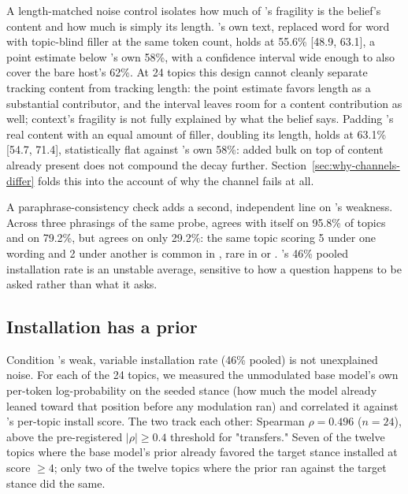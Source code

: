 A length-matched noise control isolates how much of \condB{}'s fragility is the
belief's content and how much is simply its length. \condB{}'s own text, replaced word
for word with topic-blind filler at the same token count, holds at 55.6\% [48.9, 63.1],
a point estimate below \condB{}'s own 58\%, with a confidence interval wide enough to
also cover the bare host's 62\%. At 24 topics this design cannot cleanly separate
tracking content from tracking length: the point estimate favors length as a substantial
contributor, and the interval leaves room for a content contribution as well; context's
fragility is not fully explained by what the belief says. Padding \condB{}'s real
content with an equal amount of filler, doubling its length, holds at 63.1\% [54.7,
71.4], statistically flat against \condB{}'s own 58\%: added bulk on top of content
already present does not compound the decay further. Section~\ref{sec:why-channels-differ}
folds this into the account of why the channel fails at all.

A paraphrase-consistency check adds a second, independent line on \condC{}'s
weakness.
Across three phrasings of the same probe, \condB{} agrees with itself on 95.8\% of
topics and \condF{} on 79.2\%, but \condC{} agrees on only 29.2\%: the same topic
scoring 5 under one wording and 2 under another is common in \condC{}, rare in \condB{}
or \condF{}. \condC{}'s 46\% pooled installation rate is an unstable average, sensitive
to how a question happens to be asked rather than what it asks.

\subsection{Installation has a prior}
\label{sec:dissociation-prior}

Condition \condC{}'s weak, variable installation rate (46\% pooled) is not unexplained
noise. For each of the 24 topics, we measured the unmodulated base model's own
per-token log-probability on the seeded stance (how much the model already leaned
toward that position before any modulation ran) and correlated it against \condC{}'s
per-topic install score. The two track each other: Spearman \(\rho = 0.496\)
(\(n=24\)), above the pre-registered \(|\rho| \ge 0.4\) threshold for
"transfers." Seven
of the twelve topics where the base model's prior already favored the target stance
installed at score \(\ge 4\); only two of the twelve topics where the prior ran against
the target stance did the same.

